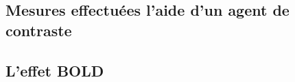 











\subsection{Mesures effectu\'ees  l'aide d'un agent de contraste}








\subsection{L'effet BOLD}






\cite{christen2012l}






